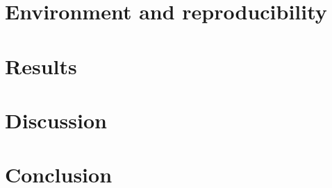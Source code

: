 \documentclass[fleqn,moreauthors,10pt]{ds_report}
\begin{document}
\section*{Environment and reproducibility}

\section*{Results}

\section*{Discussion}

\section*{Conclusion}


% 


\end{document}
